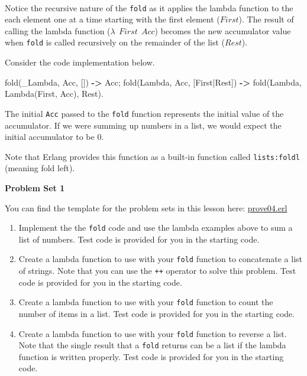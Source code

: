 \documentclass[
]{book}
\newenvironment{Shaded}{\begin{snugshade}}{\end{snugshade}}
\newcommand{\FunctionTok}[1]{\textcolor[rgb]{0.00,0.00,0.00}{#1}}
\newcommand{\OperatorTok}[1]{\textcolor[rgb]{0.81,0.36,0.00}{\textbf{#1}}}
\newcommand{\VariableTok}[1]{\textcolor[rgb]{0.00,0.00,0.00}{#1}}
\providecommand{\tightlist}{%
  \setlength{\itemsep}{0pt}\setlength{\parskip}{0pt}}
\begin{document}
\(\nonumber\)

Notice the recursive nature of the \texttt{fold} as it applies the lambda function to the each element one at a time starting with the first element (\(First\)). The result of calling the lambda function (\(\lambda ~ ~ First ~ ~ Acc\)) becomes the new accumulator value when \texttt{fold} is called recursively on the remainder of the list (\(Rest\)).

Consider the code implementation below.

\begin{Shaded}
\begin{Highlighting}[]
\FunctionTok{fold(}\VariableTok{\_Lambda}\FunctionTok{,} \VariableTok{Acc}\FunctionTok{,} \FunctionTok{[])} \OperatorTok{{-}\textgreater{}} \VariableTok{Acc}\FunctionTok{;}
\FunctionTok{fold(}\VariableTok{Lambda}\FunctionTok{,} \VariableTok{Acc}\FunctionTok{,} \FunctionTok{[}\VariableTok{First}\FunctionTok{|}\VariableTok{Rest}\FunctionTok{])} \OperatorTok{{-}\textgreater{}} \FunctionTok{fold(}\VariableTok{Lambda}\FunctionTok{,} \VariableTok{Lambda}\FunctionTok{(}\VariableTok{First}\FunctionTok{,} \VariableTok{Acc}\FunctionTok{),} \VariableTok{Rest}\FunctionTok{).}
\end{Highlighting}
\end{Shaded}

The initial \texttt{Acc} passed to the \texttt{fold} function represents the initial value of the accumulator. If we were summing up numbers in a list, we would expect the initial accumulator to be 0.

Note that Erlang provides this function as a built-in function called \texttt{lists:foldl} (meaning fold left).

\begin{problembox}

\textbf{Problem Set 1}

You can find the template for the problem sets in this lesson here: \href{proves/prove04.erl}{prove04.erl}

\begin{enumerate}
\def\labelenumi{\arabic{enumi}.}
\tightlist
\item
  Implement the the \texttt{fold} code and use the lambda examples above to sum a list of numbers. Test code is provided for you in the starting code.
\item
  Create a lambda function to use with your \texttt{fold} function to concatenate a list of strings. Note that you can use the \texttt{++} operator to solve this problem. Test code is provided for you in the starting code.
\item
  Create a lambda function to use with your \texttt{fold} function to count the number of items in a list. Test code is provided for you in the starting code.
\item
  Create a lambda function to use with your \texttt{fold} function to reverse a list. Note that the single result that a \texttt{fold} returns can be a list if the lambda function is written properly. Test code is provided for you in the starting code.
\end{enumerate}

\end{problembox}
\end{document}

